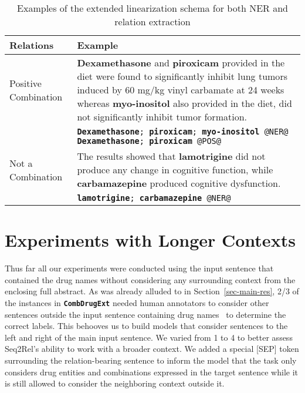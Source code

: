 \documentclass[conference]{IEEEtran}
\begin{document}
\begin{table*}[!h]
\centering
\caption{Examples of the extended linearization schema for both NER and relation extraction  \label{tab:ner}}

\begin{tabular}{p{} p{}}
\toprule
Relations &
  Example  \\ \midrule
\multirow{3.5}{*}{\parbox{4cm}{Positive Combination}} &
  \textbf{Dexamethasone} and \textbf{piroxicam} provided in the diet were found to significantly  inhibit lung tumors induced by 60 mg/kg vinyl carbamate at 24 weeks whereas \textbf{myo-inositol} also provided in the diet, did not significantly inhibit tumor  formation. \\ \cmidrule(lr){2-2}
 &
 \texttt{{\textbf{Dexamethasone}; }{\textbf{piroxicam}; }{\textbf{myo-inositol} @NER@} {\textbf{Dexamethasone}; }{\textbf{piroxicam} @POS@}}  
   \\ \midrule
\multirow{3.5}{*}{\parbox{4cm}{Not a Combination}} &
  The results showed that \textbf{lamotrigine} did not produce any change in cognitive function, while \textbf{carbamazepine} produced cognitive dysfunction. \\ \cmidrule(lr){2-2}
 &
\texttt{{\textbf{lamotrigine}; }{\textbf{carbamazepine}} @NER@} 
   \\ \bottomrule
\end{tabular}
\vspace{-3mm}
\end{table*}


\section{Experiments with Longer Contexts}
\label{sec-long}
Thus far all our experiments were conducted using the input sentence that contained the drug names without considering any surrounding context from the enclosing full abstract. As was already alluded to in Section~\ref{sec-main-res}, 2/3 of the instances in \textbf{\texttt{CombDrugExt}} needed human annotators to consider other sentences outside the input sentence containing drug names~\cite{tiktinsky-etal-2022-dataset} to determine the correct labels. This behooves us to build models that consider  sentences to the left and right of the main input sentence. 
We varied  from 1 to 4 to better assess Seq2Rel's ability to work with a broader context. We added a special [SEP] token surrounding the relation-bearing sentence to inform the model that the task only considers drug entities and combinations expressed in the target sentence while it is still allowed to consider the neighboring context outside it. 
\end{document}
